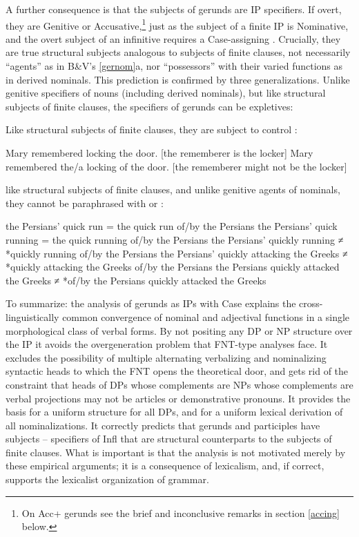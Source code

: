 \documentclass[output=paper,
modfonts
]{LSP/langsci}
\begin{document}
A further consequence is that the subjects of gerunds are IP specifiers.  If overt, they are
Genitive or Accusative,\footnote{On Acc+ gerunds see the brief and inconclusive
  remarks in section \ref{accing} below.} just as the subject of a finite IP is Nominative, and
the overt subject of an infinitive requires a Case-assigning .  Crucially, they
are true structural subjects analogous to subjects of finite clauses, not necessarily
``agents'' as in B\&V's \cref{gernom}{a}, nor ``possessors'' with their varied functions as in
derived nominals.  This prediction is confirmed by three generalizations.  Unlike genitive
specifiers of nouns (including derived nominals), but like structural subjects of finite
clauses, the specifiers of gerunds can be expletives:
Like structural subjects of finite clauses, they are subject to control \citep[1190]{huddleston2002}:
\begin{exe}
\ex\label{lock}
	\ea Mary remembered locking the door.   [the rememberer is the locker]
	\ex Mary remembered the/a locking of the door.  [the rememberer might not  be the locker]
	\z  
\end{exe}
like structural subjects of finite clauses, and unlike genitive agents of nominals, 
they  cannot be paraphrased with  or :
\begin{exe}
\ex\label{persians}
	\ea the Persians' quick run = the quick run of/by the Persians
	\ex the Persians' quick running = the quick running of/by the Persians
	\ex the Persians' quickly running ≠ *quickly running of/by the Persians
	\ex the Persians' quickly attacking the Greeks ≠ *quickly attacking the Greeks of/by the Persians
	\ex the Persians quickly attacked the Greeks ≠ *of/by the Persians quickly attacked the Greeks 
	\z
\end{exe}

To summarize:  the analysis of gerunds as IPs with Case explains the cross-linguistically
common convergence of nominal and adjectival functions in a single morphological class of
verbal forms.  By not positing any DP or NP structure over the IP it avoids the overgeneration
problem that FNT-type analyses face.  It excludes the possibility of multiple alternating
verbalizing and nominalizing syntactic heads to which the FNT opens the theoretical door, and
gets rid of the constraint that heads of DPs whose complements are NPs whose complements are
verbal projections may not be articles or demonstrative pronouns.  It provides the basis for a
uniform structure for all DPs, and for a uniform lexical derivation of all nominalizations.  It
correctly predicts that gerunds and participles have subjects – specifiers of Infl that are
structural counterparts to the subjects of finite clauses.  What is important is that the
analysis is not motivated merely by these empirical arguments; it is a consequence of
lexicalism, and, if correct, supports the lexicalist organization of grammar.
\end{document}
